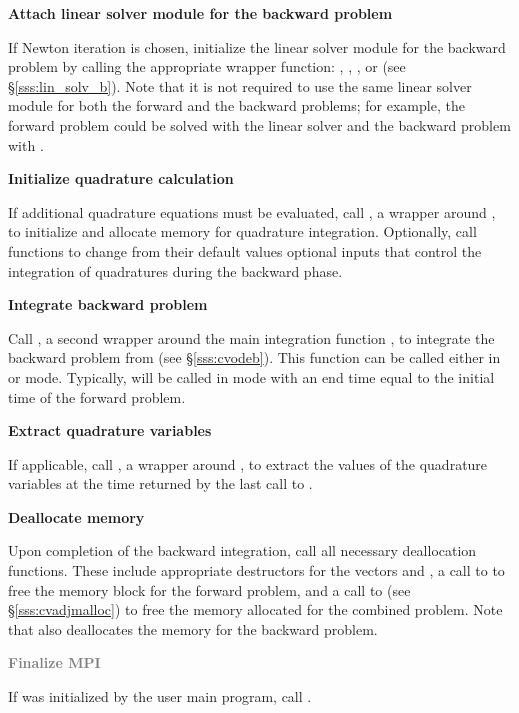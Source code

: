 \begin{Steps}
\item \label{i:lin_solverB}
  {\bf Attach linear solver module for the backward problem}

  If Newton iteration is chosen, initialize the linear solver module 
  for the backward problem by calling the appropriate wrapper
  function: , , ,
  or  (see \S\ref{sss:lin_solv_b}). Note that it is not required
  to use the same linear solver module for both the forward and the 
  backward problems; for example, the forward problem could be solved
  with the {\cvdense} linear solver and the backward problem with {\cvspgmr}.

\item \label{i:quadB}
  {\bf Initialize quadrature calculation}

  If additional quadrature equations must be evaluated, 
  call , a wrapper around ,
  to initialize and allocate memory for quadrature integration.
  Optionally, call  functions to change from their
  default values optional inputs that control the integration of
  quadratures during the backward phase.

\item
  {\bf Integrate backward problem}

  Call , a second wrapper around the {\cvodes} main integration
  function , to integrate the backward problem from 
  (see \S\ref{sss:cvodeb}). This function can be called either in 
  or  mode. Typically,  will be called in 
  mode with an end time equal to the initial time of the forward problem.

\item \label{i:back_end}
  {\bf Extract quadrature variables}

  If applicable, call , a wrapper around ,
  to extract the values of the quadrature variables at the time returned
  by the last call to .

\item
  {\bf Deallocate memory}

  Upon completion of the backward integration, call all necessary deallocation
  functions. These include appropriate destructors for the vectors 
   and , a call to  to free the {\cvodes} memory block 
  for the forward problem, and a call to  (see \S\ref{sss:cvadjmalloc}) to free 
  the memory allocated for the combined problem. 
  Note that  also deallocates the {\cvodes} memory for the backward problem.

\item
  \textcolor{gray}{\bf Finalize MPI}

  {\p} If {\mpi} was initialized by the user main program, call .

\end{Steps}


